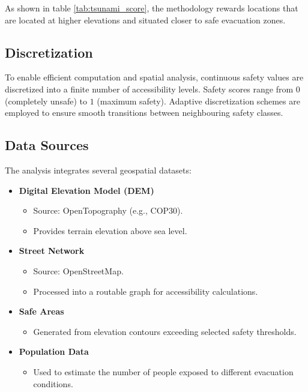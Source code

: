 As shown in table \ref{tab:tsunami_score}, the methodology rewards locations that are located at higher elevations and situated closer to safe evacuation zones.

\subsection{Discretization}

To enable efficient computation and spatial analysis, continuous safety values are discretized into a finite number of accessibility levels. Safety scores range from $0$ (completely unsafe) to $1$ (maximum safety). Adaptive discretization schemes are employed to ensure smooth transitions between neighbouring safety classes.

\subsection{Data Sources}

The analysis integrates several geospatial datasets:

\begin{itemize}
\item \textbf{Digital Elevation Model (DEM)}
\begin{itemize}
\item Source: OpenTopography (e.g., COP30).
\item Provides terrain elevation above sea level.
\end{itemize}


\item \textbf{Street Network}
\begin{itemize}
    \item Source: OpenStreetMap.
    \item Processed into a routable graph for accessibility calculations.
\end{itemize}

\item \textbf{Safe Areas}
\begin{itemize}
    \item Generated from elevation contours exceeding selected safety thresholds.
\end{itemize}

\item \textbf{Population Data}
\begin{itemize}
    \item Used to estimate the number of people exposed to different evacuation conditions.
\end{itemize}


\end{itemize}

